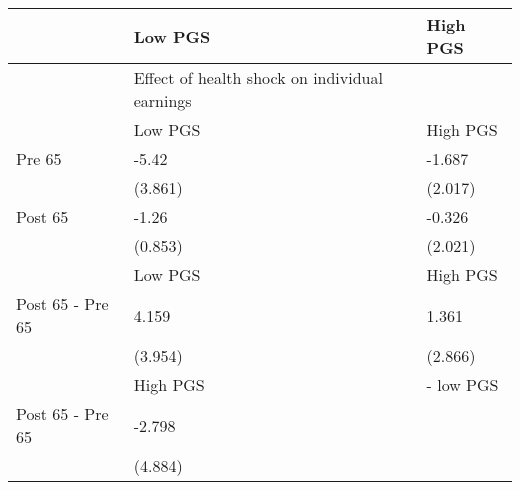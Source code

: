 % 
\begin{tabular}{lll}
  \hline
 & Low PGS & High PGS \\ 
  \hline
 & Effect of health shock on individual earnings &  \\ 
   & Low PGS & High PGS \\ 
  Pre 65 & -5.42 & -1.687 \\ 
   & (3.861) & (2.017) \\ 
  Post 65 & -1.26 & -0.326 \\ 
   & (0.853) & (2.021) \\ 
   & Low PGS & High PGS \\ 
  Post 65 - Pre 65 & 4.159 & 1.361 \\ 
   & (3.954) & (2.866) \\ 
   & High PGS  & - low PGS \\ 
  Post 65 - Pre 65 & -2.798 &  \\ 
   & (4.884) &  \\ 
   \hline
\end{tabular}
